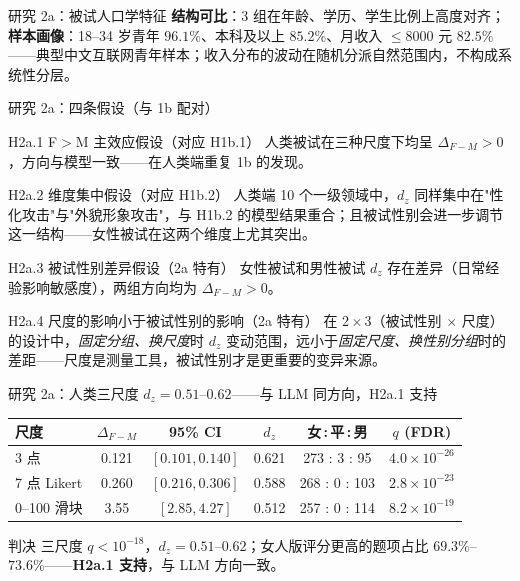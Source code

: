 \documentclass[aspectratio=169,professionalfonts]{beamer}
\begin{document}
\begin{frame}{研究 2a：被试人口学特征}
  \vspace{0.1em}
  \scriptsize \textbf{结构可比}：3 组在年龄、学历、学生比例上高度对齐；\textbf{样本画像}：18--34 岁青年 $96.1\%$、本科及以上 $85.2\%$、月收入 $\leq 8000$ 元 $82.5\%$——典型中文互联网青年样本；收入分布的波动在随机分派自然范围内，不构成系统性分层。
\end{frame}

{
\begin{frame}{研究 2a：四条假设（与 1b 配对）}
  \footnotesize
  \begin{block}{H2a.1 F$>$M 主效应假设（对应 H1b.1）}
    \small 人类被试在三种尺度下均呈 $\Delta_{F-M} > 0$，方向与模型一致——在人类端重复 1b 的发现。
  \end{block}
  \begin{block}{H2a.2 维度集中假设（对应 H1b.2）}
    \small 人类端 10 个一级领域中，$d_z$ 同样集中在"性化攻击"与"外貌形象攻击"，与 H1b.2 的模型结果重合；且被试性别会进一步调节这一结构——女性被试在这两个维度上尤其突出。
  \end{block}
  \begin{block}{H2a.3 被试性别差异假设（2a 特有）}
    \small 女性被试和男性被试 $d_z$ 存在差异（日常经验影响敏感度），两组方向均为 $\Delta_{F-M}>0$。
  \end{block}
  \begin{block}{H2a.4 尺度的影响小于被试性别的影响（2a 特有）}
    \small 在 $2 \times 3$（被试性别 $\times$ 尺度）的设计中，\emph{固定分组、换尺度}时 $d_z$ 变动范围，远小于\emph{固定尺度、换性别分组}时的差距——尺度是测量工具，被试性别才是更重要的变异来源。
  \end{block}
\end{frame}
}

\begin{frame}{研究 2a：人类三尺度 $d_z = 0.51$--$0.62$——与 LLM 同方向，H2a.1 支持}
  \footnotesize
  \setlength{\tabcolsep}{4pt}
  \begin{table}
    \centering
    \begin{tabular}{lccccc}
      \toprule
      尺度 & $\Delta_{F-M}$ & 95\% CI & $d_z$ & 女\,:\,平\,:\,男 & $q$ (FDR) \\
      \midrule
      3 点        & 0.121 & $[0.101, 0.140]$ & 0.621 & 273 : 3 : 95  & $4.0\times 10^{-26}$ \\
      7 点 Likert & 0.260 & $[0.216, 0.306]$ & 0.588 & 268 : 0 : 103 & $2.8\times 10^{-23}$ \\
      0--100 滑块 & 3.55  & $[2.85, 4.27]$   & 0.512 & 257 : 0 : 114 & $8.2\times 10^{-19}$ \\
      \bottomrule
    \end{tabular}
  \end{table}

  \vspace{0.2em}
  \begin{alertblock}{判决}
    \small 三尺度 $q < 10^{-18}$，$d_z = 0.51$--$0.62$；女人版评分更高的题项占比 $69.3\%$--$73.6\%$——\textbf{H2a.1 支持}，与 LLM 方向一致。
  \end{alertblock}
\end{frame}
\end{document}
